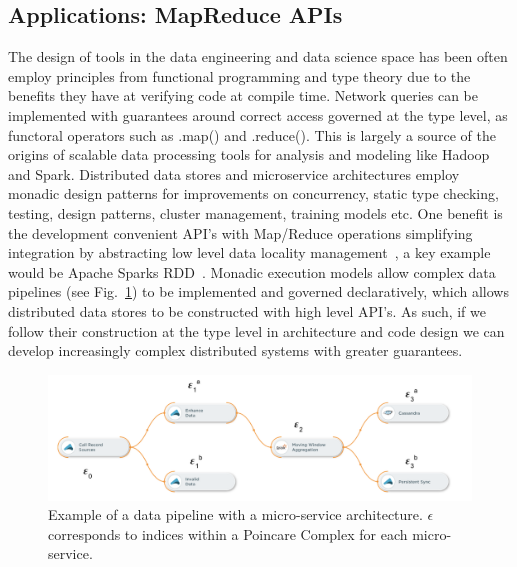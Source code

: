 \documentclass[runningheads]{llncs}
\begin{document}
\subsection{Applications: MapReduce APIs}
The design of tools in the data engineering and data science space has been often employ principles from functional programming and type theory due to the benefits they have at verifying code at compile time. Network queries can be implemented with guarantees around correct access governed at the type level, as functoral operators such as .map() and .reduce(). This is largely a source of the origins of scalable data processing tools for analysis and modeling like Hadoop and Spark. Distributed data stores and microservice architectures employ monadic design patterns for improvements on concurrency, static type checking, testing, design patterns, cluster management, training models etc. One benefit is the development convenient API's with Map/Reduce operations simplifying integration by abstracting low level data locality management~\cite{ref_book2}, a key example would be Apache Sparks RDD~\cite{ref_url1}. Monadic execution models allow complex data pipelines (see Fig.~\ref{fig3}) to be implemented and governed declaratively, which allows distributed data stores to be constructed with high level API's. As such, if we follow their construction at the type level in architecture and code design we can develop increasingly complex distributed systems with greater guarantees.
\begin{figure}
\includegraphics[width=\textwidth]{data-pipeline.png}
\caption{Example of a data pipeline with a micro-service architecture. $\epsilon$ corresponds to indices within a Poincare Complex for each micro-service.} \label{fig3}
\end{figure}
\end{document}
